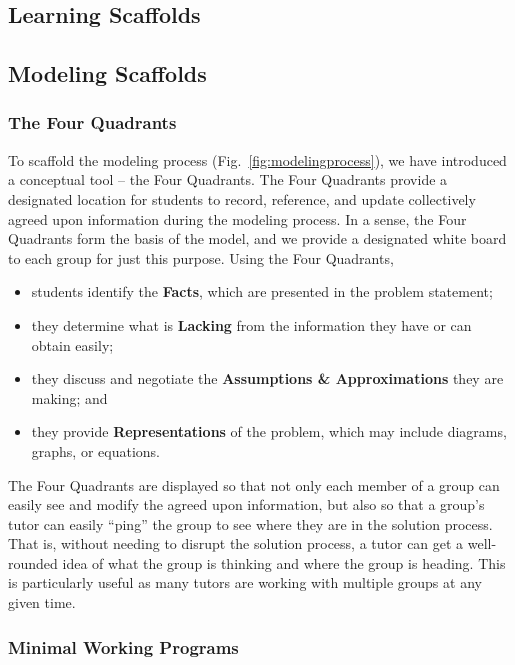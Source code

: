 \documentclass{msuphddissertation}
\begin{document}
\begin{doublespace}
%
%

\section{Learning Scaffolds}\label{sec:scaffolds}

\subsection{Modeling Scaffolds}

\subsubsection{The Four Quadrants}

To scaffold the modeling process (Fig.~\ref{fig:modelingprocess}), we have introduced a conceptual tool -- the Four Quadrants.  The Four Quadrants provide a designated location for students to record, reference, and update collectively agreed upon information during the modeling process.  In a sense, the Four Quadrants form the basis of the model, and we provide a designated white board to each group for just this purpose.  Using the Four Quadrants, 
\begin{itemize}[noitemsep,nolistsep]
\item students identify the {\bf Facts}, which are presented in the problem statement;
\item they determine what is {\bf Lacking} from the information they have or can obtain easily;
\item they discuss and negotiate the {\bf Assumptions \& Approximations} they are making; and
\item they provide {\bf Representations} of the problem, which may include diagrams, graphs, or equations.
\end{itemize}

The Four Quadrants are displayed so that not only each member of a group can easily see and modify the agreed upon information, but also so that a group's tutor can easily ``ping'' the group to see where they are in the solution process.  That is, without needing to disrupt the solution process, a tutor can get a well-rounded idea of what the group is thinking and where the group is heading.  This is particularly useful as many tutors are working with multiple groups at any given time.

\subsubsection{Minimal Working Programs}


\end{doublespace}
\end{document}
